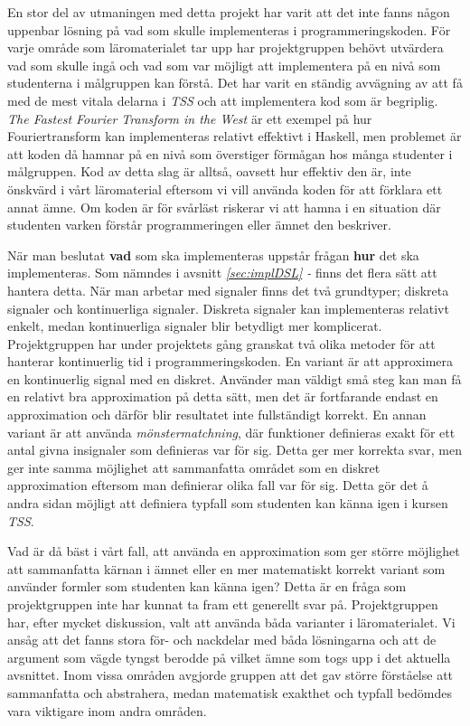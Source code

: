 \documentclass[12pt,a4paper,twoside,openright]{article}
\begin{document}
En stor del av utmaningen med detta projekt har varit att det inte
fanns någon uppenbar lösning på vad som skulle implementeras i
programmeringskoden. För varje område som läromaterialet tar upp har
projektgruppen behövt utvärdera vad som skulle ingå och vad som var
möjligt att implementera på en nivå som studenterna i målgruppen kan
förstå. Det har varit en ständig avvägning av att få med de mest
vitala delarna i \textit{TSS} och att implementera kod som är
begriplig. \textit{The Fastest Fourier Transform in the West}
\cite{fastestfourier} är ett exempel på hur Fouriertransform kan
implementeras relativt effektivt i Haskell, men problemet är att koden
då hamnar på en nivå som överstiger förmågan hos många studenter i
målgruppen. Kod av detta slag är alltså, oavsett hur effektiv den är,
inte önskvärd i vårt läromaterial eftersom vi vill använda koden för
att förklara ett annat ämne. Om koden är för svårläst riskerar vi att
hamna i en situation där studenten varken förstår programmeringen
eller ämnet den beskriver.

När man beslutat \textbf{vad} som ska implementeras uppstår frågan
\textbf{hur} det ska implementeras. Som nämndes i avsnitt
\textit{\ref{sec:implDSL} - } finns det flera
sätt att hantera detta. När man arbetar med signaler finns det två
grundtyper; diskreta signaler och kontinuerliga signaler. Diskreta
signaler kan implementeras relativt enkelt, medan kontinuerliga
signaler blir betydligt mer komplicerat. Projektgruppen har under
projektets gång granskat två olika metoder för att hanterar
kontinuerlig tid i programmeringskoden. En variant är att approximera
en kontinuerlig signal med en diskret. Använder man väldigt små steg
kan man få en relativt bra approximation på detta sätt, men det är
fortfarande endast en approximation och därför blir resultatet inte
fullständigt korrekt.
En annan variant är att använda \textit{mönstermatchning}, där
funktioner definieras exakt för ett antal givna insignaler som
definieras var för sig. Detta ger mer korrekta svar, men ger inte
samma möjlighet att sammanfatta
området som en diskret approximation eftersom man definierar olika
fall var för sig. Detta gör det å andra sidan möjligt att definiera
typfall som studenten kan känna igen i kursen \textit{TSS}.

Vad är då bäst i vårt fall, att använda en approximation som ger
större möjlighet att %
sammanfatta kärnan i ämnet eller en mer matematiskt korrekt variant
som använder formler som studenten kan känna igen? Detta är en fråga
som projektgruppen inte har kunnat ta fram ett generellt svar
på. Projektgruppen har, efter mycket diskussion, valt att använda båda
varianter i läromaterialet. Vi ansåg att det fanns stora för- och
nackdelar med båda lösningarna och att de argument som vägde tyngst
berodde på vilket ämne som togs upp i det aktuella avsnittet. Inom
vissa områden avgjorde gruppen att det gav större förståelse att
sammanfatta och abstrahera, medan matematisk exakthet och typfall
bedömdes vara viktigare inom andra områden.
\end{document}
